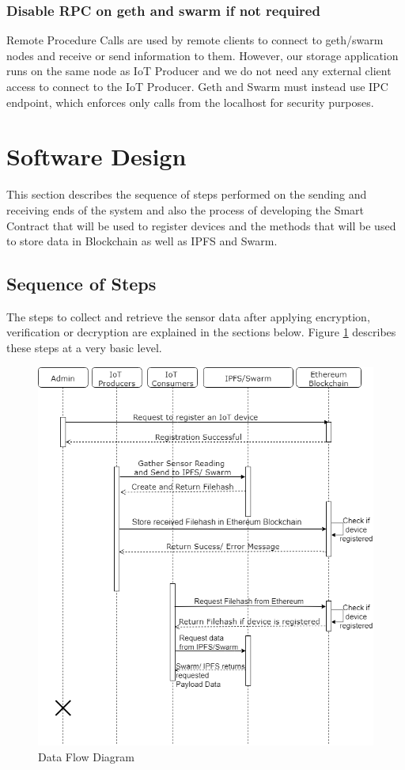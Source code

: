 \documentclass[11pt,openright]{report}
\begin{document}
\subsubsection{Disable RPC on geth and swarm if not required}
Remote Procedure Calls are used by remote clients to connect to geth/swarm nodes and receive or send information to them. However, our storage application runs on the same node as IoT Producer and we do not need any external client access to connect to the IoT Producer. Geth and Swarm must instead use IPC endpoint, which enforces only calls from the localhost for security purposes.


\section{Software Design} \label{ss:software_design}
This section describes the sequence of steps performed on the sending and receiving ends of the system and also the process of developing the Smart Contract that will be used to register devices and the methods that will be used to store data in Blockchain as well as IPFS and Swarm.

\subsection{Sequence of Steps}
The steps to collect and retrieve the sensor data after applying encryption, verification or decryption are explained in the sections below. Figure \ref{fig:dataflow_diagram} describes these steps at a very basic level.

\begin{figure}
    \centering
    \includegraphics[scale=0.5]{images/SequenceDiagram.png}
    \caption{Data Flow Diagram}
    \label{fig:dataflow_diagram}
\end{figure}
\end{document}
